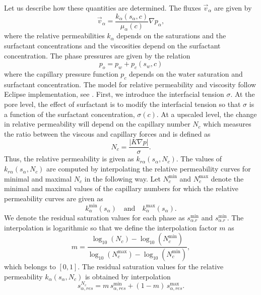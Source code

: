 \documentclass[11pt]{amsart}
\newcommand{\grad}{\nabla}
\newcommand{\abs}[1]{\left| #1\right|}
\begin{document}
Let us describe how these quantities are determined. The fluxes $\vec{v}_\alpha$ are given by
\begin{equation*}
  \vec{v}_\alpha = \frac{k_{\alpha}(s_\alpha, c)}{\mu_{\alpha}(c)}\grad p_\alpha,
\end{equation*}
where the relative permeabilities $k_{\alpha}$ depends on the saturations and the surfactant
concentrations and the viscosities depend on the surfactant concentration. The phase pressures are
given by the relation
\begin{equation}
  p_o = p_w + p_c(s_w, c) 
\end{equation}
where the capillary pressure function $p_c$ depends on the water saturation and surfactant
concentration. The model for relative permeability and viscosity follow Eclipse implementation, see
\cite{eclipse, jorgensen}. First, we introduce the interfacial tension $\sigma$. At the pore level,
the effect of surfactant is to modify the interfacial tension so that $\sigma$ is a function of the
surfactant concentration, $\sigma(c)$. At a upscaled level, the change in relative permeability will
depend on the capillary number $N_c$ which measures the ratio between the viscous and capillary
forces and is defined as
\begin{equation}
  \label{eq:defNc}
  N_c = \frac{\abs{K\grad p}}{\sigma}.
\end{equation}
Thus, the relative permeability is given as $k_{r\alpha}(s_\alpha, N_c)$. The values of
$k_{r\alpha}(s_\alpha, N_c)$ are computed by interpolating the relative permeability curves for
minimal and maximal $N_c$ in the following way. Let $N_c^{\min}$ and $N_c^{\max}$ denote the minimal
and maximal values of the capillary numbers for which the relative permeability curves are given as
\begin{equation*}
  k_{\alpha}^{\min}(s_\alpha)\quad\text{and}\quad k_{\alpha}^{\max}(s_\alpha).
\end{equation*}
We denote the residual saturation values for each phase as $s_{\alpha.r}^{\min}$ and
$s_{\alpha.r}^{\min}$. The interpolation is logarithmic so that we define the interpolation factor
$m$ as
\begin{equation} 
  \label{eq:defm}
  m = \frac{\log_{10}(N_c) - \log_{10}(N_c^{\min})}{\log_{10}(N_c^{\max}) - \log_{10}(N_c^{\min})},
\end{equation}
which belongs to $[0,1]$. The residual saturation values for the relative permeability
$k_{\alpha}(s_\alpha, N_c)$ is obtained by interpolation
\begin{equation}
  \label{eq:srhat}
  s_{\alpha,res}^{N_c} = m\,s_{\alpha,res}^{\min} + (1 - m)\,s_{\alpha,res}^{\max}.
\end{equation}
\end{document}
